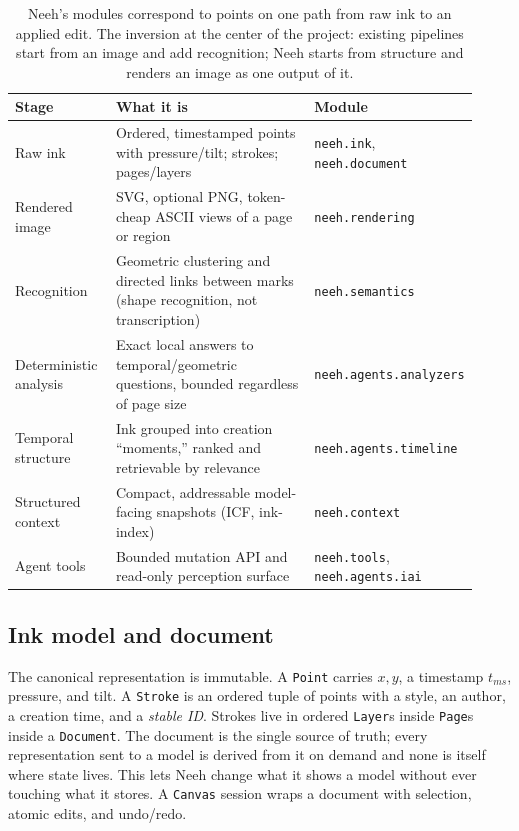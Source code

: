 \documentclass[11pt]{article}
\newcommand{\code}[1]{\texttt{#1}}
\begin{document}
\begin{table}[t]
\centering
\small
\begin{tabular}{@{}>{\raggedright\arraybackslash}p{0.22\linewidth} >{\raggedright\arraybackslash}p{0.46\linewidth} >{\raggedright\arraybackslash}p{0.24\linewidth}@{}}
\toprule
\textbf{Stage} & \textbf{What it is} & \textbf{Module} \\
\midrule
Raw ink & Ordered, timestamped points with pressure/tilt; strokes; pages/layers & \code{neeh.ink}, \code{neeh.document} \\
Rendered image & SVG, optional PNG, token-cheap ASCII views of a page or region & \code{neeh.rendering} \\
Recognition & Geometric clustering and directed links between marks (shape recognition, not transcription) & \code{neeh.semantics} \\
Deterministic analysis & Exact local answers to temporal/geometric questions, bounded regardless of page size & \code{neeh.agents.analyzers} \\
Temporal structure & Ink grouped into creation ``moments,'' ranked and retrievable by relevance & \code{neeh.agents.timeline} \\
Structured context & Compact, addressable model-facing snapshots (ICF, ink-index) & \code{neeh.context} \\
Agent tools & Bounded mutation API and read-only perception surface & \code{neeh.tools}, \code{neeh.agents.iai} \\
\bottomrule
\end{tabular}
\caption{Neeh's modules correspond to points on one path from raw ink to an
applied edit. The inversion at the center of the project: existing pipelines
start from an image and add recognition; Neeh starts from structure and renders
an image as one output of it.}
\label{tab:stages}
\end{table}

\subsection{Ink model and document}
The canonical representation is immutable. A \code{Point} carries $x, y$, a
timestamp $t_{ms}$, pressure, and tilt. A \code{Stroke} is an ordered tuple of
points with a style, an author, a creation time, and a \emph{stable ID}. Strokes
live in ordered \code{Layer}s inside \code{Page}s inside a \code{Document}. The
document is the single source of truth; every representation sent to a model is
derived from it on demand and none is itself where state lives. This lets Neeh
change what it shows a model without ever touching what it stores. A
\code{Canvas} session wraps a document with selection, atomic edits, and
undo/redo.
\end{document}
